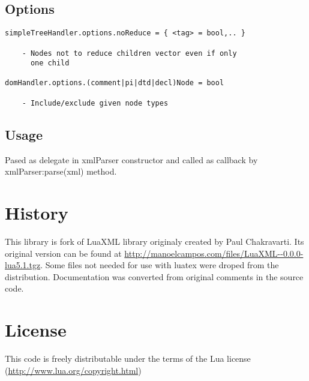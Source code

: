 \documentclass{ltxdoc}
\begin{document}
\subsection{Options}

\begin{verbatim}
simpleTreeHandler.options.noReduce = { <tag> = bool,.. }

    - Nodes not to reduce children vector even if only 
      one child

domHandler.options.(comment|pi|dtd|decl)Node = bool 

    - Include/exclude given node types
\end{verbatim}
\subsection{Usage}

Pased as delegate in xmlParser constructor and called as callback by
xmlParser:parse(xml) method.

\section{History}

This library is fork of LuaXML library originaly created by Paul
Chakravarti. Its original version can be found at
\url{http://manoelcampos.com/files/LuaXML--0.0.0-lua5.1.tgz}. Some files not
needed for use with luatex were droped from the distribution.
Documentation was converted from original comments in the source code.

\section{License}

This code is freely distributable under the terms of the Lua license
(\url{http://www.lua.org/copyright.html})
\end{document}
